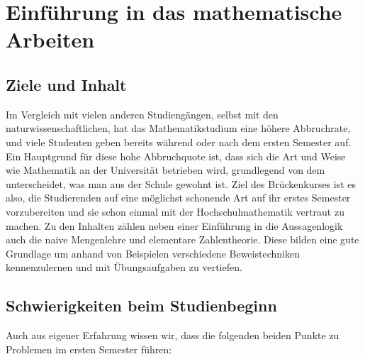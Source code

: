 \chapter{Einführung in das mathematische Arbeiten}

\section{Ziele und Inhalt}
Im Vergleich mit vielen anderen Studiengängen, selbst mit den
naturwissenschaftlichen, hat das Mathematikstudium eine höhere Abbruchrate,
und viele Studenten geben bereits während oder nach dem ersten Semester auf.
Ein Hauptgrund für diese hohe Abbruchquote ist, dass sich die Art und Weise wie
Mathematik an der Universität betrieben wird, grundlegend von dem unterscheidet,
was man aus der Schule gewohnt ist.
Ziel des Brückenkurses ist es also, die Studierenden auf eine möglichst schonende
Art auf ihr erstes Semester vorzubereiten und sie schon einmal mit der
Hochschulmathematik vertraut zu machen.
Zu den Inhalten zählen neben einer Einführung in die Aussagenlogik auch die
naive Mengenlehre und elementare Zahlentheorie.
Diese bilden eine gute Grundlage um anhand von Beispielen verschiedene
Beweistechniken kennenzulernen und mit Übungsaufgaben zu vertiefen.


\newpage
\section{Schwierigkeiten beim Studienbeginn}
Auch aus eigener Erfahrung wissen wir, dass die folgenden beiden Punkte zu
Problemen im ersten Semester führen:

